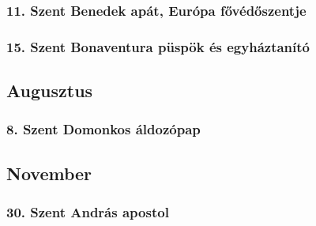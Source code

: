 \documentclass[twoside]{article}
\begin{document}
        \subsubsection*{11. Szent Benedek apát, Európa fővédőszentje}
            \begin{gregosheet}
            \end{gregosheet}
        \subsubsection*{15. Szent Bonaventura püspök és egyháztanító}
            \begin{gregosheet}
            \end{gregosheet}
    \subsection*{Augusztus}
        \subsubsection*{8. Szent Domonkos áldozópap}
            \begin{gregosheet}
            \end{gregosheet}
    \subsection*{November}
        \subsubsection*{30. Szent András apostol}
            \begin{gregosheet}
            \end{gregosheet}
\padtotwo
\end{document}
